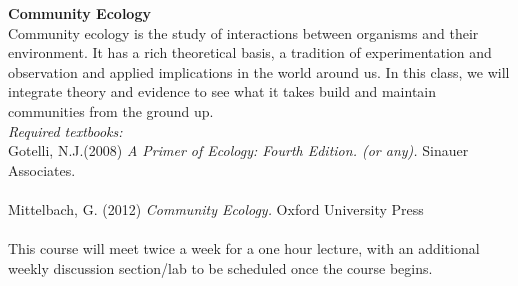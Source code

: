 \documentclass{article}\usepackage[]{graphicx}\usepackage[]{color}
\begin{document}
\textbf{Community Ecology}\\
\indent Community ecology is the study of interactions between organisms and their environment. It has a rich theoretical basis, a tradition of experimentation and observation and applied implications  in the world around us. In this class, we will integrate theory and evidence to see what it takes build and maintain communities from the ground up. \\

\textit{Required textbooks:}\\
Gotelli, N.J.(2008) \textit{A Primer of Ecology: Fourth Edition. (or any).} Sinauer Associates. \\
\\
Mittelbach, G. (2012) \textit{Community Ecology.} Oxford University Press \\
\\
\indent This course will meet twice a week for a one hour lecture, with an additional weekly discussion section/lab to be scheduled once the course begins.\\
\end{document}

